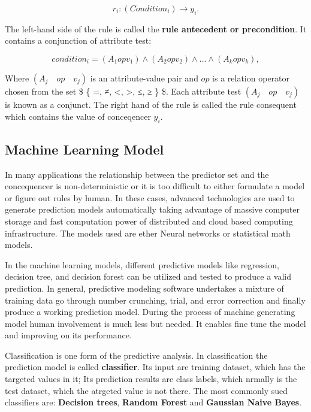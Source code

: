 \documentclass[
]{book}
\begin{document}
\begin{equation} 
r_i:   (Condition_i) →  y_i.
  \label{eq:rule}
\end{equation}

The left-hand side of the rule is called the \textbf{rule antecedent or precondition}. It contains a conjunction of attribute test:

\begin{equation} 
condition_i = (A_1 op v_1 ) ∧ (A_2 op v_2 ) ∧ … ∧(A_k  op v_k ),
  \label{eq:condition}
\end{equation}

Where \((A_j\quad op\quad v_j )\) is an attribute-value pair and \(op\) is a relation operator chosen from the set \$ \{ =, ≠, \textless, \textgreater, ≤, ≥ \} \$. Each attribute test \((A_j\quad op \quad v_j )\) is known as a conjunct. The right hand of the rule is called the rule consequent which contains the value of conceqencer \(y_i\).

\hypertarget{machine-learning-model}{%
\subsection{Machine Learning Model}\label{machine-learning-model}}

In many applications the relationship between the predictor set and the concequencer is non-deterministic or it is too difficult to either formulate a model or figure out rules by human. In these cases, advanced technologies are used to generate prediction models automatically taking advantage of massive computer storage and fast computation power of distributed and cloud based computing infrastructure. The models used are ether Neural networks or statistical math models.

In the machine learning models, different predictive models like regression, decision tree, and decision forest can be utilized and tested to produce a valid prediction. In general, predictive modeling software undertakes a mixture of training data go through number crunching, trial, and error correction and finally produce a working prediction model. During the process of machine generating model human involvement is much less but needed. It enables fine tune the model and improving on its performance.

Classification is one form of the predictive analysis. In classification the prediction model is called \textbf{classifier}. Its input are training dataset, which has the targeted values in it; Its prediction results are class labels, which nrmally is the test dataset, which the atrgeted value is not there. The most commonly sued classifiers are: \textbf{Decision trees}, \textbf{Random Forest} and \textbf{Gaussian Naive Bayes}.
\end{document}
